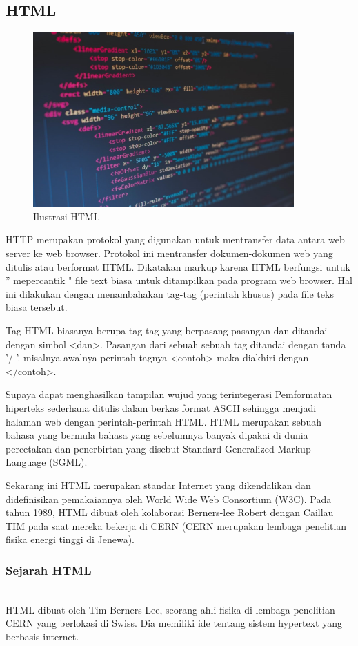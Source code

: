 \subsection{HTML}
	\begin{figure}[H]
		\includegraphics[width=10cm]{figures/html.jpg}
		\centering
		\caption{Ilustrasi HTML}
	\end{figure}
HTTP merupakan protokol yang digunakan untuk mentransfer data antara web server ke web browser. Protokol ini mentransfer dokumen-dokumen web yang ditulis atau berformat HTML. Dikatakan markup karena HTML berfungsi untuk '' mepercantik " file text biasa untuk ditampilkan pada program web browser. Hal ini dilakukan dengan menambahakan tag-tag (perintah khusus) pada file teks biasa tersebut.

Tag HTML biasanya berupa tag-tag yang berpasang pasangan dan ditandai dengan simbol <dan>. Pasangan dari sebuah sebuah tag ditandai dengan tanda '/ '. misalnya awalnya perintah tagnya <contoh> maka diakhiri dengan </contoh>.

	Supaya dapat menghasilkan tampilan wujud yang terintegerasi Pemformatan hiperteks sederhana ditulis dalam berkas format ASCII sehingga menjadi halaman web dengan perintah-perintah HTML.
HTML merupakan sebuah bahasa yang bermula bahasa yang sebelumnya banyak dipakai di dunia percetakan dan penerbirtan yang disebut Standard Generalized Markup Language (SGML).
	
	Sekarang ini HTML merupakan standar Internet yang dikendalikan dan didefinisikan pemakaiannya oleh World Wide Web Consortium (W3C). Pada tahun 1989, HTML dibuat oleh kolaborasi Berners-lee Robert dengan Caillau TIM pada saat mereka bekerja di CERN (CERN merupakan lembaga penelitian fisika energi tinggi di Jenewa).

\subsubsection{Sejarah HTML}
\hfill\\
HTML dibuat oleh Tim Berners-Lee, seorang ahli fisika di lembaga penelitian CERN yang berlokasi di Swiss. Dia memiliki ide tentang sistem hypertext yang berbasis internet.

